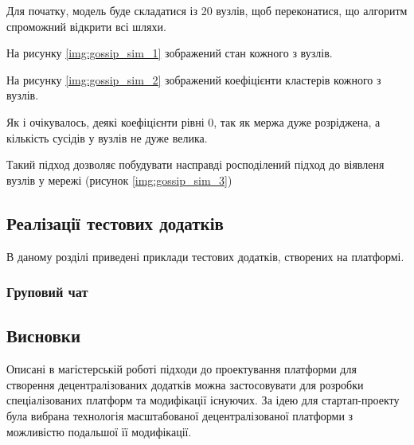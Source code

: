 \documentclass{lib/styles/default-style}
\begin{document}
    Для початку, модель буде складатися із 20 вузлів, щоб переконатися, що алгоритм спроможний відкрити всі шляхи.

    На рисунку \ref{img:gossip_sim_1} зображений стан кожного з вузлів.


    На рисунку \ref{img:gossip_sim_2} зображений коефіцієнти кластерів кожного з вузлів.


    Як і очікувалось, деякі коефіцієнти рівні 0, так як мержа дуже розріджена, а кількість сусідів у вузлів 
    не дуже велика.

    Такий підход дозволяє побудувати насправді росподілений підход до віявленя вузлів у мережі (рисунок \ref{img:gossip_sim_3})


\subsection{Реалізації тестових додатків}

В даному розділі приведені приклади тестових додатків, створених на платформі.

\subsubsection{Груповий чат}

\subsection{Висновки}

\startStartupSection
Описані в магістерській роботі підходи до проектування платформи для створення децентралізованих додатків
можна застосовувати для розробки спеціалізованих платформ та модифікації існуючих.
За ідею для стартап-проекту була вибрана технологія масштабованої децентралізованої платформи з можливістю подальшої її модифікації.



\startStartupSection
\startStartupSection
\startStartupSection
\startStartupSection


\end{document}
